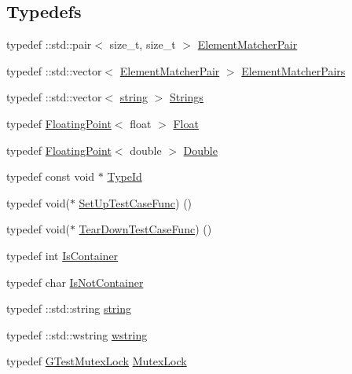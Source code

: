 \subsection*{Typedefs}
\begin{DoxyCompactItemize}
\item 
typedef \+::std\+::pair$<$ size\+\_\+t, size\+\_\+t $>$ \hyperlink{namespacetesting_1_1internal_a109863545f08651178bf0f520aebd33b}{Element\+Matcher\+Pair}
\item 
typedef \+::std\+::vector$<$ \hyperlink{namespacetesting_1_1internal_a109863545f08651178bf0f520aebd33b}{Element\+Matcher\+Pair} $>$ \hyperlink{namespacetesting_1_1internal_a0038618710c01a71150887dc7cfb0a29}{Element\+Matcher\+Pairs}
\item 
typedef \+::std\+::vector$<$ \hyperlink{namespacetesting_1_1internal_a8e8ff5b11e64078831112677156cb111}{string} $>$ \hyperlink{namespacetesting_1_1internal_a7706b17f05f4b49e351b052ae4e05073}{Strings}
\item 
typedef \hyperlink{classtesting_1_1internal_1_1FloatingPoint}{Floating\+Point}$<$ float $>$ \hyperlink{namespacetesting_1_1internal_a02e1981f5ff70609e6ac06e006ff519a}{Float}
\item 
typedef \hyperlink{classtesting_1_1internal_1_1FloatingPoint}{Floating\+Point}$<$ double $>$ \hyperlink{namespacetesting_1_1internal_a66a7579b1893b260c31dad577f7a5c48}{Double}
\item 
typedef const void $\ast$ \hyperlink{namespacetesting_1_1internal_ab1114197d3c657d8b7f8e0c5caa12d00}{Type\+Id}
\item 
typedef void($\ast$ \hyperlink{namespacetesting_1_1internal_a30037044c0b57cdd647c7e2e97cb2cff}{Set\+Up\+Test\+Case\+Func}) ()
\item 
typedef void($\ast$ \hyperlink{namespacetesting_1_1internal_a085e31321d0d029c04d2a79234f60c1a}{Tear\+Down\+Test\+Case\+Func}) ()
\item 
typedef int \hyperlink{namespacetesting_1_1internal_ad8f0c2883245f1df2a53618a49f0deb3}{Is\+Container}
\item 
typedef char \hyperlink{namespacetesting_1_1internal_abf080521ce135deb510e0a7830fd3d33}{Is\+Not\+Container}
\item 
typedef \+::std\+::string \hyperlink{namespacetesting_1_1internal_a8e8ff5b11e64078831112677156cb111}{string}
\item 
typedef \+::std\+::wstring \hyperlink{namespacetesting_1_1internal_a3f543179329c353aee1d7b54a9a8e335}{wstring}
\item 
typedef \hyperlink{classtesting_1_1internal_1_1GTestMutexLock}{G\+Test\+Mutex\+Lock} \hyperlink{namespacetesting_1_1internal_a08b187c6cc4e28400aadf9a32fccc8de}{Mutex\+Lock}

\end{DoxyCompactItemize}
